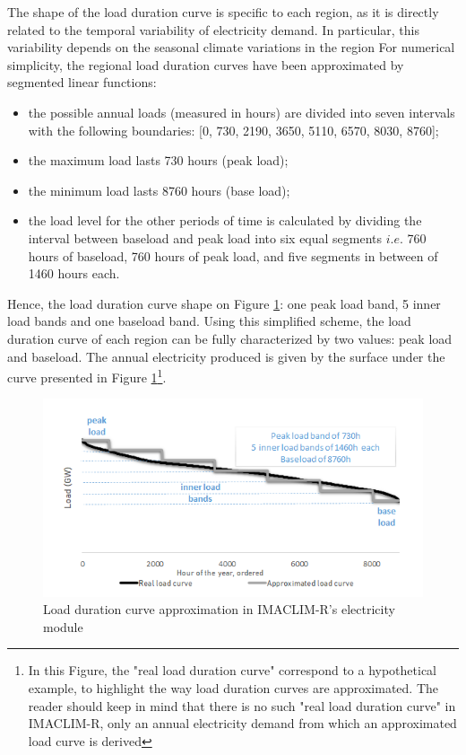 The shape of the load duration curve is specific to each region, as it is directly related to the temporal variability of electricity demand. In particular, this variability depends on the seasonal climate variations in the region
For numerical simplicity, the regional load duration curves have been approximated by segmented linear functions:
\begin{itemize}
    \item the possible annual loads (measured in hours) are divided into seven intervals with the following boundaries: [0, 730, 2190, 3650, 5110, 6570, 8030, 8760];
    \item the maximum load lasts 730 hours (peak load);
    \item the minimum load lasts 8760 hours (base load);
    \item the load level for the other periods of time is calculated by dividing the interval between baseload and peak load into six equal segments $i.e.$ 760 hours of baseload, 760 hours of peak load, and five segments in between of 1460 hours each.
\end{itemize}

Hence, the load duration curve shape on Figure \ref{fig:LDC}: one peak load band, 5 inner load bands and one baseload band.
Using this simplified scheme, the load duration curve of each region can be fully characterized by two values: peak load and baseload. The annual electricity produced is given by the surface under the curve presented in Figure \ref{fig:LDC}\footnote{In this Figure, the "real load duration curve" correspond to a hypothetical example, to highlight the way load duration curves are approximated. The reader should keep in mind that there is no such "real load duration curve" in IMACLIM-R, only an annual electricity demand from which an approximated load curve is derived}.

\begin{figure}
    \includegraphics{figures&tables/LDC.png}
    \caption{Load duration curve approximation in IMACLIM-R's electricity module}
    \centering
    \label{fig:LDC}
\end{figure}


